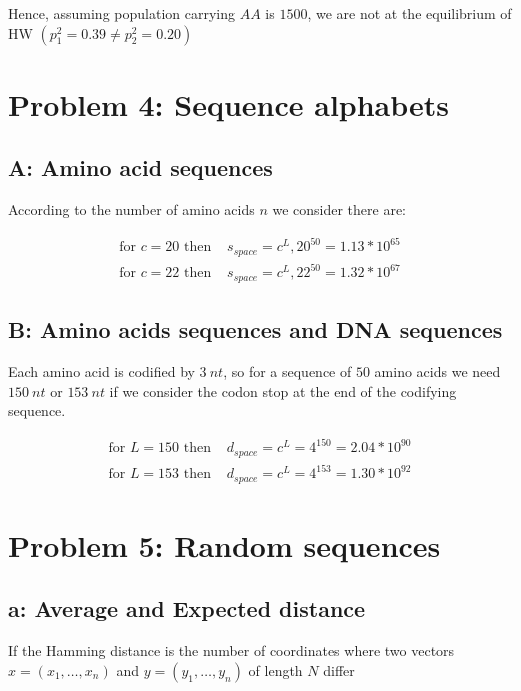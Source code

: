 Hence, assuming population carrying $AA$ is $1500$, we are not at the equilibrium of HW $(p^{2}_1 = 0.39 \neq p^{2}_2 = 0.20)$

\setcounter{chapter}{4}
\setcounter{section}{0}
\section{Problem 4: Sequence alphabets}

\subsection{A: Amino acid sequences}

According to the number of amino acids $n$ we consider there are:

\begin{align}
\text{for } c = 20 \text{ then } &s_{space} = c^L, 20^{50} = 1.13*10^{65}\\
\text{for } c = 22 \text{ then } &s_{space} = c^L, 22^{50} = 1.32*10^{67}
\end{align}

\subsection{B: Amino acids sequences and DNA sequences}

Each amino acid is codified by $3~nt$, so for a sequence of $50$ amino acids we need $150~nt$ or $153~nt$ if we consider the codon stop at the end of the codifying sequence.

\begin{align}
\text{for } L = 150 \text{ then } &d_{space} = c^L =  4^{150} = 2.04*10^{90}\\
\text{for } L = 153 \text{ then } &d_{space} = c^L =  4^{153} = 1.30*10^{92}
\end{align}

\setcounter{chapter}{5}
\setcounter{section}{0}
\section{Problem 5: Random sequences}

\subsection{a: Average and Expected distance}

If the Hamming distance is the number of coordinates where two vectors $x = (x_1,\dots,x_n) $ and $y = (y_1, \dots, y_n)$ of length $N$ differ

